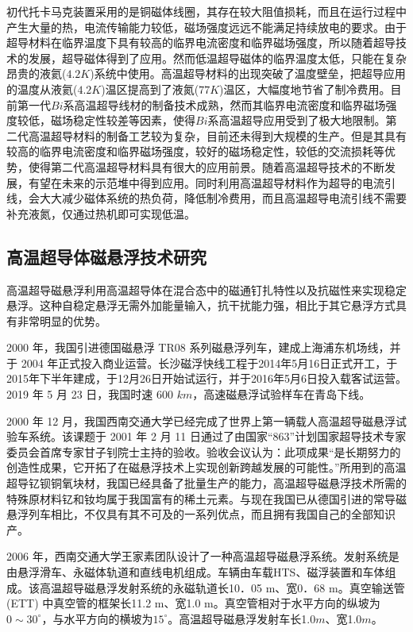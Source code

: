 \documentclass[UTF8, twocolumn]{ctexart}
\begin{document}
    初代托卡马克装置采用的是铜磁体线圈，其存在较大阻值损耗，而且在运行过程中产生大量的热，电流传输能力较低，磁场强度远远不能满足持续放电的要求。由于超导材料在临界温度下具有较高的临界电流密度和临界磁场强度，所以随着超导技术的发展，超导磁体得到了应用。然而低温超导磁体的临界温度太低，只能在复杂昂贵的液氦($4.2K$)系统中使用。高温超导材料的出现突破了温度壁垒，把超导应用的温度从液氦($4.2K$)温区提高到了液氮($77K$)温区，大幅度地节省了制冷费用。目前第一代$Bi$系高温超导线材的制备技术成熟，然而其临界电流密度和临界磁场强度较低，磁场稳定性较差等因素，使得$Bi$系高温超导应用受到了极大地限制。第二代高温超导材料的制备工艺较为复杂，目前还未得到大规模的生产。但是其具有较高的临界电流密度和临界磁场强度，较好的磁场稳定性，较低的交流损耗等优势，使得第二代高温超导材料具有很大的应用前景。随着高温超导技术的不断发展，有望在未来的示范堆中得到应用。同时利用高温超导材料作为超导的电流引线，会大大减少磁体系统的热负荷，降低制冷费用，而且高温超导电流引线不需要补充液氮，仅通过热机即可实现低温\cite{孙林煜2012第二代高温超导体研究与在聚变领域应用前景}。

    \subsection{高温超导体磁悬浮技术研究}
    高温超导磁悬浮利用高温超导体在混合态中的磁通钉扎特性以及抗磁性来实现稳定悬浮。这种自稳定悬浮无需外加能量输入，抗干扰能力强，相比于其它悬浮方式具有非常明显的优势。\cite{刘文旭2020高温超导磁悬浮技术研究论述}

    2000 年，我国引进德国磁悬浮 TR08 系列磁悬浮列车，建成上海浦东机场线，并于 2004 年正式投入商业运营\cite{1643050}。长沙磁浮快线工程于2014年5月16日正式开工，于2015年下半年建成，于12月26日开始试运行，并于2016年5月6日投入载客试运营。2019 年 5 月 23 日，我国时速 600 $km$，高速磁悬浮试验样车在青岛下线。

    2000 年 12 月，我国西南交通大学已经完成了世界上第一辆载人高温超导磁悬浮试验车系统。该课题于 2001 年 2 月 11 日通过了由国家“863”计划国家超导技术专家委员会首席专家甘子钊院士主持的验收。验收会议认为：此项成果“是长期努力的创造性成果，它开拓了在磁悬浮技术上实现创新跨越发展的可能性。”所用到的高温超导钇钡铜氧块材，我国已经具备了批量生产的能力，高温超导磁悬浮技术所需的特殊原材料钇和钕均属于我国富有的稀土元素。与现在我国已从德国引进的常导磁悬浮列车相比，不仅具有其不可及的一系列优点，而且拥有我国自己的全部知识产。\cite{沈志云2012在我国建设世界上第一条高温超导磁悬浮列车试运行线的建议}

    2006 年，西南交通大学王家素团队设计了一种高温超导磁悬浮系统。发射系统是由悬浮滑车、永磁体轨道和直线电机组成。车辆由车载HTS、磁浮装置和车体组成。该高温超导磁悬浮发射系统的永磁轨道长10．05 m、宽0．68 m。真空输送管(ETT) 中真空管的框架长11.2 m、宽1.0 m。真空管相对于水平方向的纵坡为$0\sim 30^\circ$，与水平方向的横坡为$15^\circ$。高温超导磁悬浮发射车长1.0$m$、宽1.0$m$。\cite{pan2011influence}
\end{document}
